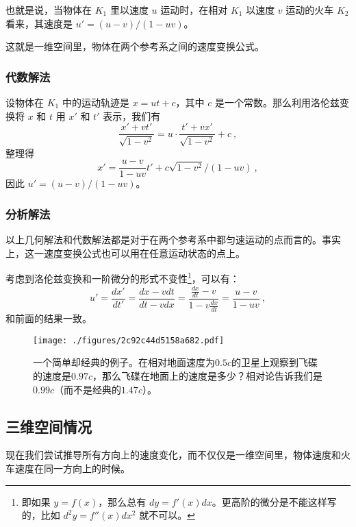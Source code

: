 也就是说，当物体在 $K_1$ 里以速度 $u$ 运动时，在相对 $K_1$ 以速度 $v$ 运动的火车 $K_2$ 看来，其速度是 $u'=(u-v)/(1-uv)$。

这就是一维空间里，物体在两个参考系之间的速度变换公式。

\subsubsection{代数解法}

设物体在 $K_1$ 中的运动轨迹是 $x=ut+c$，其中 $c$ 是一个常数。那么利用洛伦兹变换将 $x$ 和 $t$ 用 $x'$ 和 $t'$ 表示，我们有
\begin{equation}
\frac{x'+vt'}{\sqrt{1-v^2}}=u\cdot\frac{t'+vx'}{\sqrt{1-v^2}}+c~,
\end{equation}
整理得
\begin{equation}
x'=\frac{u-v}{1-uv}t'+c\sqrt{1-v^2}/(1-uv)~,
\end{equation}
因此 $u'=(u-v)/(1-uv)$。

\subsubsection{分析解法}

以上几何解法和代数解法都是对于在两个参考系中都匀速运动的点而言的。事实上，这一速度变换公式也可以用在任意运动状态的点上。

考虑到洛伦兹变换和一阶微分的形式不变性\footnote{即如果 $y=f(x)$，那么总有 $dy=f'(x)dx$。更高阶的微分是不能这样写的，比如 $d^2y=f''(x)dx^2$ 就不可以。}，可以有：
\begin{equation}
u'=\frac{dx'}{dt'}=\frac{dx-vdt}{dt-vdx}=\frac{\frac{dx}{dt}-v}{1-v\frac{dx}{dt}}=\frac{u-v}{1-uv}~,
\end{equation}
和前面的结果一致。

\begin{figure}[ht]
\centering
\texttt{[image: ./figures/2c92c44d5158a682.pdf]}
\caption{一个简单却经典的例子。在相对地面速度为$0.5c$的卫星上观察到飞碟的速度是$0.97c$，那么飞碟在地面上的速度是多少？相对论告诉我们是$0.99c$（而不是经典的$1.47c$）。} \label{fig_RelVel_2}
\end{figure}

\subsection{三维空间情况}

现在我们尝试推导所有方向上的速度变化，而不仅仅是一维空间里，物体速度和火车速度在同一方向上的时候。

